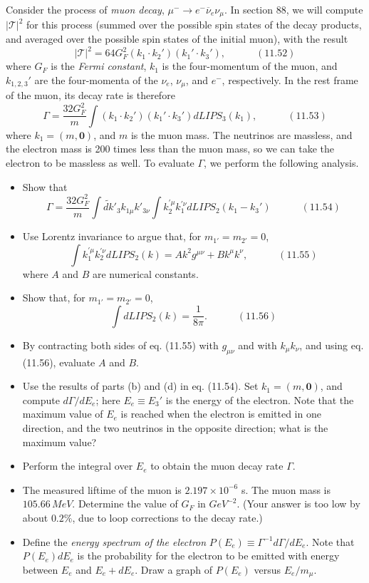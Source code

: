 \documentclass[twoside]{amsart}
\newcommand{\problemhead}[1]
  {\smallskip
   \noindent{\large\bf Problem #1.}
   }
\begin{document}
\problemhead{11.3} Consider the process of \emph{muon decay}, $\mu^- \to e^- \overline{\nu}_e \nu_{\mu}$.  In section 88, we will compute $|\mathcal{T}|^2$ for this process (summed over the possible spin states of the decay products, and averaged over the possible spin states of the initial muon), with the result
\[
|\mathcal{T}|^2 = 64 G_F^2 (k_1 \cdot k_2')(k_1' \cdot k_3'), \quad \quad \quad (11.52)
\]
where $G_F$ is the \emph{Fermi constant}, $k_1$ is the four-momentum of the muon, and $k_{1,2,3}'$ are the four-momenta of the $\nu_e$, $\nu_{\mu}$, and $e^-$, respectively.  In the rest frame of the muon, its decay rate is therefore
\[
\Gamma = \frac{32 G_F^2}{m} \int (k_1 \cdot k_2')(k_1'\cdot k_3') dLIPS_3(k_1), \quad \quad \quad (11.53)
\]
where $k_1 = (m,\mathbf{0})$, and $m$ is the muon mass.  The neutrinos are massless, and the electron mass is 200 times less than the muon mass, so we can take the electron to be massless as well.  To evaluate $\Gamma$, we perform the following analysis.  
\begin{itemize}
\item[(a)] Show that 
\[
\Gamma = \frac{32 G_F^2 }{m} \int \widetilde{dk}'_3 k_{1\mu} k'_{3\nu} \int k^{'\mu}_2 k_1^{' \nu} dLIPS_2(k_1-k_3') \quad \quad \quad (11.54)
\]
\item[(b)] Use Lorentz invariance to argue that, for $m_{1'} = m_{2'} = 0$, 
\[
\int k_1^{'\mu} k_2^{'\nu} dLIPS_2(k) = Ak^2 g^{\mu \nu} + Bk^{\mu} k^{\nu}, \quad \quad \quad (11.55)
\]
where $A$ and $B$ are numerical constants.
\item[(c)] Show that, for $m_{1'} = m_{2'} =0$,
\[
\int dLIPS_2(k) = \frac{1}{8\pi} . \quad \quad \quad  (11.56)
\]
\item[(d)] By contracting both sides of eq. (11.55) with $g_{\mu \nu}$ and with $k_{\mu} k_{\nu}$, and using eq. (11.56), evaluate $A$ and $B$.  
\item[(e)] Use the results of parts (b) and (d) in eq. (11.54).  Set $k_1 = (m,\mathbf{0})$, and compute $d\Gamma/dE_e$; here $E_e \equiv E_3'$ is the energy of the electron.  Note that the maximum value of $E_e$ is reached when the electron is emitted in one direction, and the two neutrinos in the opposite direction; what is the maximum value?  
\item[(f)] Perform the integral over $E_e$ to obtain the muon decay rate $\Gamma$.  
\item[(g)] The measured liftime of the muon is $2.197 \times 10^{-6}$ s.  The muon mass is $105.66 \, MeV$.  Determine the value of $G_F$ in $GeV^{-2}$.  (Your answer is too low by about $0.2\%$, due to loop corrections to the decay rate.)
\item[(h)] Define the \emph{energy spectrum of the electron} $P(E_e) \equiv \Gamma^{-1} d\Gamma/dE_e$.  Note that $P(E_e) dE_e$ is the probability for the electron to be emitted with energy between $E_e$ and $E_e + dE_e$.  Draw a graph of $P(E_e)$ versus $E_e/m_{\mu}$.  
\end{itemize}
\end{document}
